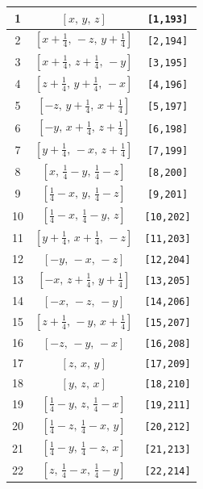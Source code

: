 \documentclass[fleqn,8pt]{jsarticle}
\begin{document}
\begin{longtable}{ccc}
1 & $\left[ x,\, y,\, z \right]$ & {\tt [1,193]} \\ \hline
2 & $\left[ x + \frac{1}{4},\, - z,\, y + \frac{1}{4} \right]$ & {\tt [2,194]} \\ \hline
3 & $\left[ x + \frac{1}{4},\, z + \frac{1}{4},\, - y \right]$ & {\tt [3,195]} \\ \hline
4 & $\left[ z + \frac{1}{4},\, y + \frac{1}{4},\, - x \right]$ & {\tt [4,196]} \\ \hline
5 & $\left[ - z,\, y + \frac{1}{4},\, x + \frac{1}{4} \right]$ & {\tt [5,197]} \\ \hline
6 & $\left[ - y,\, x + \frac{1}{4},\, z + \frac{1}{4} \right]$ & {\tt [6,198]} \\ \hline
7 & $\left[ y + \frac{1}{4},\, - x,\, z + \frac{1}{4} \right]$ & {\tt [7,199]} \\ \hline
8 & $\left[ x,\, \frac{1}{4} - y,\, \frac{1}{4} - z \right]$ & {\tt [8,200]} \\ \hline
9 & $\left[ \frac{1}{4} - x,\, y,\, \frac{1}{4} - z \right]$ & {\tt [9,201]} \\ \hline
10 & $\left[ \frac{1}{4} - x,\, \frac{1}{4} - y,\, z \right]$ & {\tt [10,202]} \\ \hline
11 & $\left[ y + \frac{1}{4},\, x + \frac{1}{4},\, - z \right]$ & {\tt [11,203]} \\ \hline
12 & $\left[ - y,\, - x,\, - z \right]$ & {\tt [12,204]} \\ \hline
13 & $\left[ - x,\, z + \frac{1}{4},\, y + \frac{1}{4} \right]$ & {\tt [13,205]} \\ \hline
14 & $\left[ - x,\, - z,\, - y \right]$ & {\tt [14,206]} \\ \hline
15 & $\left[ z + \frac{1}{4},\, - y,\, x + \frac{1}{4} \right]$ & {\tt [15,207]} \\ \hline
16 & $\left[ - z,\, - y,\, - x \right]$ & {\tt [16,208]} \\ \hline
17 & $\left[ z,\, x,\, y \right]$ & {\tt [17,209]} \\ \hline
18 & $\left[ y,\, z,\, x \right]$ & {\tt [18,210]} \\ \hline
19 & $\left[ \frac{1}{4} - y,\, z,\, \frac{1}{4} - x \right]$ & {\tt [19,211]} \\ \hline
20 & $\left[ \frac{1}{4} - z,\, \frac{1}{4} - x,\, y \right]$ & {\tt [20,212]} \\ \hline
21 & $\left[ \frac{1}{4} - y,\, \frac{1}{4} - z,\, x \right]$ & {\tt [21,213]} \\ \hline
22 & $\left[ z,\, \frac{1}{4} - x,\, \frac{1}{4} - y \right]$ & {\tt [22,214]} \\ \hline

\end{longtable}
\end{document}
